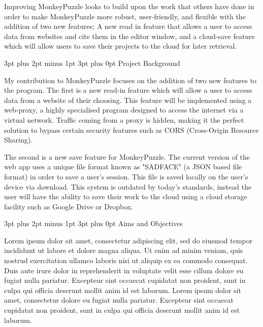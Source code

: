 \documentclass[12pt,a4paper]{article}
\makeatletter
\renewcommand\subsection{\@startsection {subsection}{1}{2mm} %
                               {3pt plus 2pt minus 1pt} %
                               {3pt plus 0pt} %
                               {\normalfont\bfseries}}
\makeatother
\begin{document}
Improving MonkeyPuzzle looks to build upon the work that others have done in order to make MonkeyPuzzle more robust, user-friendly, and flexible with the addition of two new features; A new read in feature that allows a user to access data from websites and cite them in the editor window, and a cloud-save feature which will allow users to save their projects to the cloud for later retrieval.

\newpage

\subsection{Project Background}


My contribution to MonkeyPuzzle focuses on the addition of two new features to the program. The first is a new read-in feature which will allow a user to access data from a website of their choosing. This feature will be implemented using a web-proxy, a highly specialised program designed to access the internet via a virtual network. Traffic coming from a proxy is hidden, making it the perfect solution to bypass certain security features such as CORS (Cross-Origin Resource Sharing). \newline

The second is a new save feature for MonkeyPuzzle. The current version of the web app uses a unique file format known as "SADFACE" (a JSON based file format) in order to save a user's session. This file is saved locally on the user's device via download. This system is outdated by today's standards, instead the user will have the ability to save their work to the cloud using a cloud storage facility such as Google Drive or Dropbox.

\newpage


\subsection{Aims and Objectives}

Lorem ipsum dolor sit amet, consectetur adipiscing elit, sed do eiusmod tempor incididunt ut labore et dolore magna aliqua. Ut enim ad minim veniam, quis nostrud exercitation ullamco laboris nisi ut aliquip ex ea commodo consequat. Duis aute irure dolor in reprehenderit in voluptate velit esse cillum dolore eu fugiat nulla pariatur. Excepteur sint occaecat cupidatat non proident, sunt in culpa qui officia deserunt mollit anim id est laborum. Lorem ipsum dolor sit amet, consectetur dolore eu fugiat nulla pariatur. Excepteur sint occaecat cupidatat non proident, sunt in culpa qui officia deserunt mollit anim id est laborum. \newline
\end{document}
